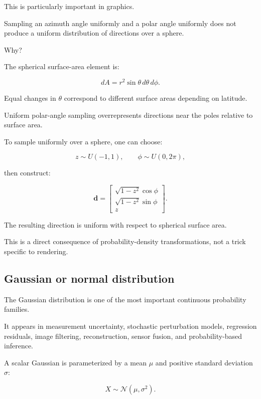\hypertarget{02-foundations-ii-ch023-uniform-in-coordinates-is-not-always-uniform-geometrically}{}

This is particularly important in graphics.

Sampling an azimuth angle uniformly and a polar angle uniformly does not produce a uniform distribution of directions over a sphere.

Why?

The spherical surface-area element is:

\[
 dA=r^2\sin\theta\,d\theta\,d\phi.
\]

Equal changes in \(\theta\) correspond to different surface areas depending on latitude.

Uniform polar-angle sampling overrepresents directions near the poles relative to surface area.

To sample uniformly over a sphere, one can choose:

\[
 z\sim U(-1,1), \qquad \phi\sim U(0,2\pi),
\]

then construct:

\[
 \mathbf d= \begin{bmatrix} \sqrt{1-z^2}\cos\phi\\ \sqrt{1-z^2}\sin\phi\\ z \end{bmatrix}.
\]

The resulting direction is uniform with respect to spherical surface area.

This is a direct consequence of probability-density transformations, not a trick specific to rendering.

\subsection{Gaussian or normal distribution}\label{02-foundations-ii-ch023-gaussian-or-normal-distribution}

\hypertarget{02-foundations-ii-ch023-gaussian-or-normal-distribution}{}

The Gaussian distribution is one of the most important continuous probability families.

It appears in measurement uncertainty, stochastic perturbation models, regression residuals, image filtering, reconstruction, sensor fusion, and probability-based inference.

A scalar Gaussian is parameterized by a mean \(\mu\) and positive standard deviation \(\sigma\):

\[
 \boxed{ X\sim\mathcal N(\mu,\sigma^2) }.
\]

